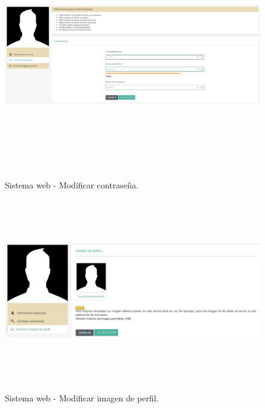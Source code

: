 \documentclass[12pt,a4paper, twoside]{report}
\begin{document}
	\newpage
	
	\begin{figure}[!ht]   
		\caption{Sistema web - Modificar contraseña.} 
		\begin{center} 
			\includegraphics[width=18cm, height=10cm]{Images/userGuide/web/passwordProfile} \\
			\label{fig:web_passwordProfile} 
		\end{center}  	
	\end{figure}
	
	\begin{figure}[!ht]   
		\caption{Sistema web - Modificar imagen de perfil.} 
		\begin{center} 
			\includegraphics[width=18cm, height=8cm]{Images/userGuide/web/imageProfile} \\
			\label{fig:web_imageProfile} 
		\end{center}  	
	\end{figure}
\end{document}
